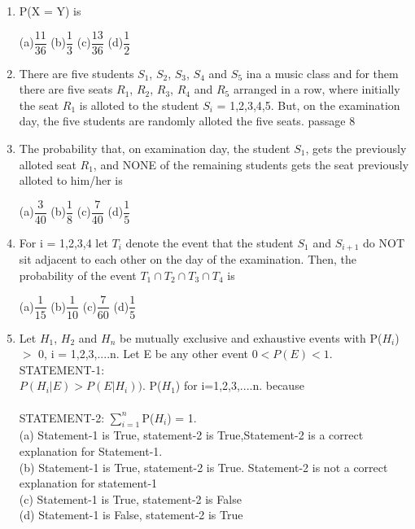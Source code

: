 \documentclass[journal,12pt,twocolumn]{IEEEtran}
\begin{document}
\begin{enumerate}[label=\arabic*]
\begin{multicols}{4}
	(c)$\dfrac{1}{2}$ 
	(d)$\dfrac{7}{120}$
	\end{multicols}
	\item P(X = Y) is
	\begin{multicols}{4}
	(a)$\dfrac{11}{36}$ 
	(b)$\dfrac{1}{3}$   
	(c)$\dfrac{13}{36}$ 
	(d)$\dfrac{1}{2}$
	\end{multicols}
	\item There are five students $S_1$, $S_2$, $S_3$, $S_4$  and $S_5$ ina a music class and for them there are five seats $R_1$,
$R_2$, $R_3$, $R_4$ and $R_5$  arranged in a row, where initially the seat $R_1$ is alloted to the student $S_i$ = 1,2,3,4,5. But, on the examination day, the five students are randomly alloted the five seats.     passage 8\\
	\item The probability that, on examination day, the student $S_1$, gets the previously alloted seat $R_1$, and NONE of the remaining students gets the seat previously alloted to him/her is
	\begin{multicols}{4}
	(a)$\dfrac{3}{40}$  
	(b)$\dfrac{1}{8}$  
	(c)$\dfrac{7}{40}$  
	(d)$\dfrac{1}{5}$
	\end{multicols}
	\item For i = 1,2,3,4 let $T_i$ denote the event that the student $S_1$ and $S_{i+1}$ do NOT sit adjacent to each other on the day of the examination. Then, the probability of the event $T_1 \cap T_2 \cap T_3 \cap T_4$ is
	\begin{multicols}{4}
	(a)$\dfrac{1}{15}$ 
	(b)$\dfrac{1}{10}$  
	(c)$\dfrac{7}{60}$  
	(d)$\dfrac{1}{5}$
	\end{multicols}
	\item Let $H_1$, $H_2$ and $H_n$ be mutually exclusive and exhaustive events with P($H_i$) $>$ 0, i = 1,2,3,....n. Let E be any other event $0<P(E)<1$.\\
	STATEMENT-1:\\
	$P(H_i | E)>P(E|H_i))$. P($H_1$) for i=1,2,3,....n. because\\
	\\
	STATEMENT-2:
	$\sum_{i=1}^{n}$P($H_i$) = 1.\\
	(a) Statement-1 is True, statement-2 is True,Statement-2 is a correct explanation for Statement-1.\\
	(b) Statement-1 is True, statement-2 is True. Statement-2 is not a correct explanation for statement-1\\
	(c) Statement-1 is True, statement-2 is False\\
	(d) Statement-1 is False, statement-2 is True\\

\end{enumerate}
\end{document}
